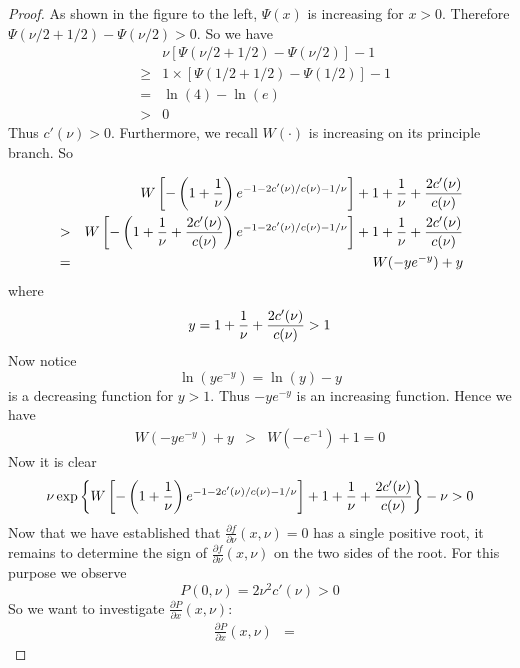 \documentclass{article}
\newcommand{\pd}[2]{
  \frac{\partial #1}{\partial #2}
}
\newcommand{\1}[1]{
  \mathbf{1}_{\{#1\}}
}
\begin{document}
\begin{proof}
\begin{minipage}{0.48\textwidth}
  \end{minipage}\hfill
  \begin{minipage}{0.5\textwidth}
    As shown in the figure to the left, $\Psi(x)$ is increasing
    for $x > 0$. Therefore $\Psi(\nu/2 + 1/2) - \Psi(\nu/2) > 0$.
    So we have
    \begin{eqnarray*}
      && \nu \left[
        \Psi(\nu/2 + 1/2) - \Psi(\nu/2)
      \right] - 1 \\
      &\geq& 1 \times \left[
        \Psi(1/2 + 1/2) - \Psi(1/2)
      \right] - 1 \\
      &=& \ln(4) - \ln(e) \\
      &>& 0
    \end{eqnarray*}
    Thus $c'(\nu) > 0$. Furthermore, we recall
    $W(\cdot)$ is increasing on its principle branch. So
  \end{minipage}
  \begin{eqnarray*}
    &&
    W\left[
      -\left( 1 + {1 \over \nu} \right)
      e^{-1 - 2 c'(\nu)/c(\nu) - 1/\nu}
    \right]
    + 1 + {1 \over \nu} + {2 c'(\nu) \over c(\nu)} \\
    &>& 
    W\left[
      -\left( 1 + {1 \over \nu} + {2 c'(\nu) \over c(\nu)} \right)
      e^{-1 - 2 c'(\nu)/c(\nu) - 1/\nu}
    \right]
    + 1 + {1 \over \nu} + {2 c'(\nu) \over c(\nu)} \\
    &=& W(-y e^{-y}) + y
  \end{eqnarray*}
  where
  \[
  y = 1 + {1 \over \nu} + {2 c'(\nu) \over c(\nu)} > 1
  \]
  Now notice
  \[
  \ln(y e^{-y}) = \ln(y) - y
  \]
  is a decreasing function for $y > 1$. Thus $-y e^{-y}$ is an
  increasing function. Hence we have
  \begin{eqnarray*}
    W(-y e^{-y}) + y &>& W(-e^{-1}) + 1 = 0
  \end{eqnarray*}
  Now it is clear
  \[
  \nu\exp\left\{
    W\left[
      -\left(1 + {1 \over \nu}\right)
      e^{-1 - 2 c'(\nu)/c(\nu) - 1/\nu}
    \right]
    + 1 + {1 \over \nu} + {2 c'(\nu) \over c(\nu)}
  \right\} - \nu > 0
  \]
  Now that we have established that $\pd{f}{\nu}(x, \nu) = 0$ has a
  single positive root, it remains to determine the sign of
  $\pd{f}{\nu}(x, \nu)$ on the two sides of the root. For this purpose
  we observe
  \begin{equation}
    \label{eq:xxie5.1}
    P(0, \nu) = 2 \nu^2 c'(\nu) > 0
  \end{equation}
  So we want to investigate $\pd{P}{x}(x, \nu)$:
  \begin{eqnarray}
    \pd{P}{x}(x, \nu) &=&

\end{eqnarray}
\end{proof}
\end{document}
